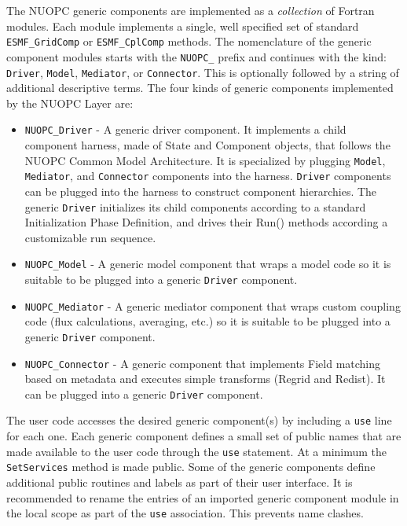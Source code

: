
The NUOPC generic components are implemented as a {\em collection} of Fortran modules. Each module implements a single, well specified set of standard {\tt ESMF\_GridComp} or {\tt ESMF\_CplComp} methods. The nomenclature of the generic component modules starts with the {\tt NUOPC\_} prefix and continues with the kind: {\tt Driver}, {\tt Model}, {\tt Mediator}, or {\tt Connector}. This is optionally followed by a string of additional descriptive terms. The four kinds of generic components implemented by the NUOPC Layer are:

\begin{itemize}

\item {\tt NUOPC\_Driver} - A generic driver component. It implements a child component harness, made of State and Component objects, that follows the NUOPC Common Model Architecture. It is specialized by plugging {\tt Model}, {\tt Mediator}, and {\tt Connector} components into the harness. {\tt Driver} components can be plugged into the harness to construct component hierarchies. The generic {\tt Driver} initializes its child components according to a standard Initialization Phase Definition, and drives their Run() methods according a customizable run sequence.

\item {\tt NUOPC\_Model} - A generic model component that wraps a model code so it is suitable to be plugged into a generic {\tt Driver} component.

\item {\tt NUOPC\_Mediator} - A generic mediator component that wraps custom coupling code (flux calculations, averaging, etc.) so it is suitable to be plugged into a generic {\tt Driver} component.

\item {\tt NUOPC\_Connector} - A generic component that implements Field matching based on metadata and executes simple transforms (Regrid and Redist). It can be plugged into a generic {\tt Driver} component.

\end{itemize}

The user code accesses the desired generic component(s) by including a {\tt use} line for each one. Each generic component defines a small set of public names that are made available to the user code through the {\tt use} statement. At a minimum the {\tt SetServices} method is made public. Some of the generic components define additional public routines and labels as part of their user interface. It is recommended to rename the entries of an imported generic component module in the local scope as part of the {\tt use} association. This prevents name clashes.

